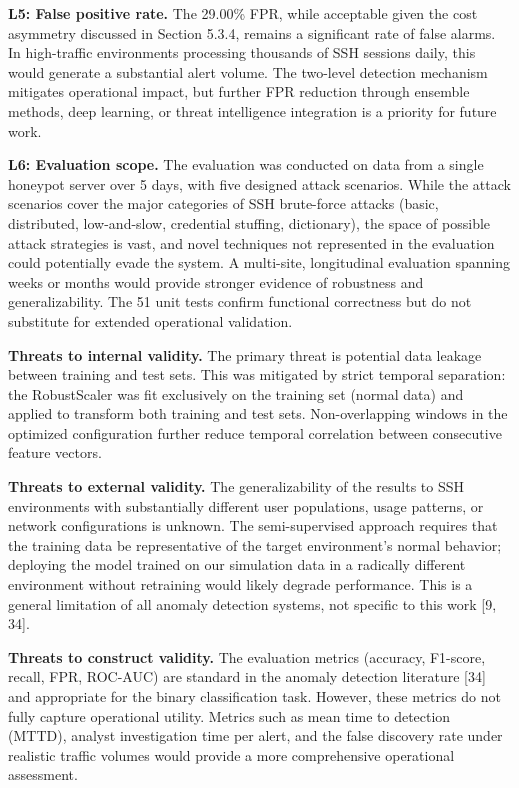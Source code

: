 \documentclass[
  a4paper]{report}
\begin{document}
\textbf{L5: False positive rate.} The 29.00\% FPR, while acceptable
given the cost asymmetry discussed in Section 5.3.4, remains a
significant rate of false alarms. In high-traffic environments
processing thousands of SSH sessions daily, this would generate a
substantial alert volume. The two-level detection mechanism mitigates
operational impact, but further FPR reduction through ensemble methods,
deep learning, or threat intelligence integration is a priority for
future work.

\textbf{L6: Evaluation scope.} The evaluation was conducted on data from
a single honeypot server over 5 days, with five designed attack
scenarios. While the attack scenarios cover the major categories of SSH
brute-force attacks (basic, distributed, low-and-slow, credential
stuffing, dictionary), the space of possible attack strategies is vast,
and novel techniques not represented in the evaluation could potentially
evade the system. A multi-site, longitudinal evaluation spanning weeks
or months would provide stronger evidence of robustness and
generalizability. The 51 unit tests confirm functional correctness but
do not substitute for extended operational validation.

\textbf{Threats to internal validity.} The primary threat is potential
data leakage between training and test sets. This was mitigated by
strict temporal separation: the RobustScaler was fit exclusively on the
training set (normal data) and applied to transform both training and
test sets. Non-overlapping windows in the optimized configuration
further reduce temporal correlation between consecutive feature vectors.

\textbf{Threats to external validity.} The generalizability of the
results to SSH environments with substantially different user
populations, usage patterns, or network configurations is unknown. The
semi-supervised approach requires that the training data be
representative of the target environment's normal behavior; deploying
the model trained on our simulation data in a radically different
environment without retraining would likely degrade performance. This is
a general limitation of all anomaly detection systems, not specific to
this work {[}9, 34{]}.

\textbf{Threats to construct validity.} The evaluation metrics
(accuracy, F1-score, recall, FPR, ROC-AUC) are standard in the anomaly
detection literature {[}34{]} and appropriate for the binary
classification task. However, these metrics do not fully capture
operational utility. Metrics such as mean time to detection (MTTD),
analyst investigation time per alert, and the false discovery rate under
realistic traffic volumes would provide a more comprehensive operational
assessment.
\end{document}
